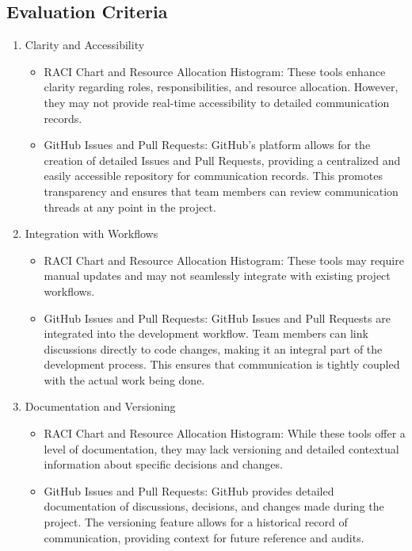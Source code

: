 \documentclass[12pt,titlepage,a4paper]{report}
\begin{document}
        \subsection{Evaluation Criteria}
        \begin{enumerate}[label=\roman*.]
            \item Clarity and Accessibility
            \begin{itemize}
                \item RACI Chart and Resource Allocation Histogram: These tools enhance clarity regarding roles, responsibilities, and resource allocation. However, they may not provide real-time accessibility to detailed communication records.
                \item GitHub Issues and Pull Requests: GitHub's platform allows for the creation of detailed Issues and Pull Requests, providing a centralized and easily accessible repository for communication records. This promotes transparency and ensures that team members can review communication threads at any point in the project.
            \end{itemize}
            \item Integration with Workflows
            \begin{itemize}
                \item RACI Chart and Resource Allocation Histogram: These tools may require manual updates and may not seamlessly integrate with existing project workflows.
                \item GitHub Issues and Pull Requests: GitHub Issues and Pull Requests are integrated into the development workflow. Team members can link discussions directly to code changes, making it an integral part of the development process. This ensures that communication is tightly coupled with the actual work being done.
            \end{itemize}
            \item Documentation and Versioning
            \begin{itemize}
                \item RACI Chart and Resource Allocation Histogram: While these tools offer a level of documentation, they may lack versioning and detailed contextual information about specific decisions and changes.
                \item GitHub Issues and Pull Requests: GitHub provides detailed documentation of discussions, decisions, and changes made during the project. The versioning feature allows for a historical record of communication, providing context for future reference and audits.
            \end{itemize}
        \end{enumerate}
        \newpage
\end{document}
